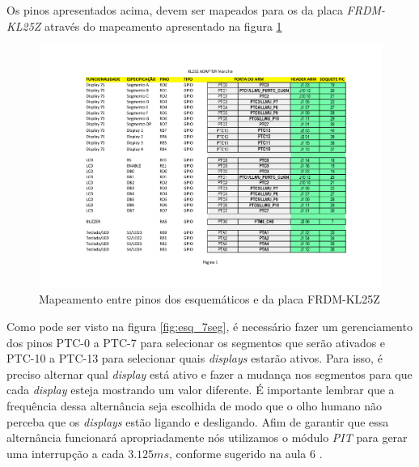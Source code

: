 \documentclass{article}
\begin{document}
Os pinos apresentados acima, devem ser mapeados para os da placa \textit{FRDM-KL25Z} através do mapeamento apresentado na figura \ref{fig:pinout}
\begin{figure}[H]
	\centering
	\includegraphics[width=0.9\linewidth]{Pinout}
	\caption{Mapeamento entre pinos dos esquemáticos e da placa FRDM-KL25Z}
	\label{fig:pinout}
\end{figure}

Como pode ser visto na figura \ref{fig:esq_7seg}, é necessário fazer um gerenciamento dos pinos PTC-0 a PTC-7 para selecionar os segmentos que serão ativados e PTC-10 a PTC-13 para selecionar quais \textit{displays} estarão ativos. Para isso, é preciso alternar qual \textit{display} está ativo e fazer a mudança nos segmentos para que cada \textit{display} esteja mostrando um valor diferente. É importante lembrar que a frequência dessa alternância seja escolhida de modo que o olho humano não perceba que os \textit{displays} estão ligando e desligando. Afim de garantir que essa alternância funcionará apropriadamente nós utilizamos o módulo \textit{PIT} para gerar uma interrupção a cada $3.125 ms$, conforme sugerido na aula 6 \cite{bb:aula6}. 
\end{document}
